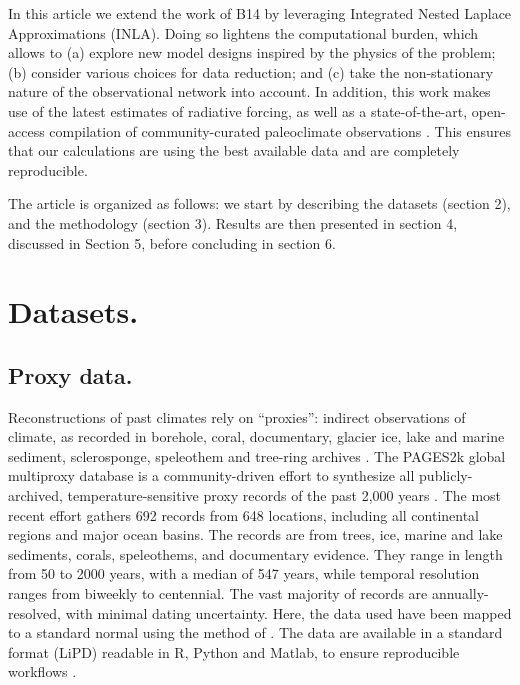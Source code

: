\documentclass[12pt]{amsart}
\theoremstyle{plain}
\theoremstyle{definition}
\theoremstyle{remark}
\begin{document}
In this article we extend the work of B14 by leveraging Integrated Nested Laplace
Approximations (INLA). Doing so lightens the computational burden, which allows to (a) explore new model designs inspired by the physics of the problem; (b) consider various choices for data reduction; and (c) take the non-stationary nature of the observational network into account.  In addition, this work makes use of the latest estimates of radiative forcing, as well as a state-of-the-art, open-access compilation of community-curated paleoclimate observations \citep{PAGES2kSD2017short}. This ensures that our calculations are using the best available data and are completely reproducible.  

The article is organized as follows: we start by describing the datasets (section 2), and the methodology (section 3). Results are then presented in section 4, discussed in Section 5, before concluding in section 6. 

\section{Datasets.}
\label{sec:data}

\subsection{Proxy data.}
Reconstructions of past climates rely on ``proxies'': indirect observations of climate, as recorded in borehole, coral, documentary, glacier
ice, lake and marine sediment, sclerosponge, speleothem and tree-ring archives
\citep{Jones_Holocene09}. The PAGES2k global multiproxy database is a community-driven effort to
synthesize all publicly-archived, temperature-sensitive proxy records of the
past 2,000 years \citep{PAGES2kSD2017short}. The most recent effort gathers 692 records from 648 locations, including all continental regions and major ocean basins. The records are from trees, ice, marine and lake sediments, corals, speleothems, and documentary evidence. They range in length from 50 to 2000 years, with a median of 547 years, while temporal resolution ranges from biweekly to centennial.
  The vast majority of records are annually-resolved, with minimal dating uncertainty. Here, the data used have been mapped to a standard normal using the method of \cite{vanAlbada2007}. The data are available in a standard format (LiPD) readable in R, Python and Matlab, to ensure reproducible workflows \citep{lipd_cp}.   
\end{document}
